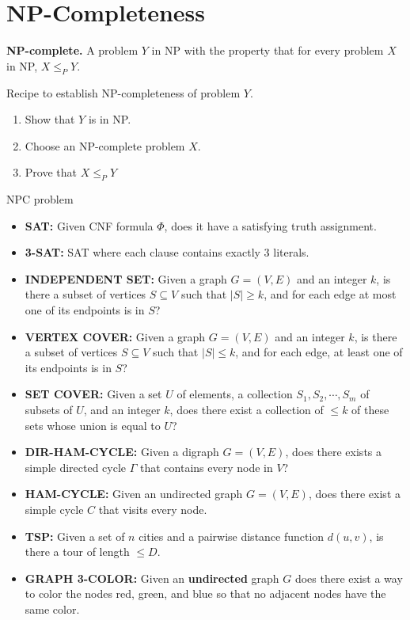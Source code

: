 \documentclass{article}
\begin{document}
\section*{NP-Completeness}
\textbf{NP-complete. } 
A problem $Y$ in NP with the property that for every
problem $X$ in NP, $X \leq_P Y$.

Recipe to establish NP-completeness of problem $Y$.
\begin{enumerate}
    \item Show that $Y$ is in NP.
    \item Choose an NP-complete problem $X$.
    \item Prove that $X \leq_P Y$
\end{enumerate}

NPC problem
\begin{itemize}
    \item \textbf{SAT: } Given CNF formula $\Phi$, does it have a satisfying truth assignment.
    \item \textbf{3-SAT: } SAT where each clause contains exactly $3$ literals.
    \item \textbf{INDEPENDENT SET:} Given a graph $G = (V, E)$ and an integer $k$, 
    is there a subset of vertices $S \subseteq V$ such that $|S| \geq k$, 
    and for each edge at most one of its endpoints is in $S$?
    \item \textbf{VERTEX COVER:} Given a graph $G = (V, E)$ and an integer $k$,
    is there a subset of vertices $S \subseteq V$ such that $|S| \leq k$, 
    and for each edge, at least one of its endpoints is in $S$?
    \item \textbf{SET COVER: } Given a set $U$ of elements, 
    a collection $S_1 , S_2 , \cdots , S_m$ of subsets of $U$, 
    and an integer $k$, does there exist a collection of $\leq k$ of
    these sets whose union is equal to $U$?
    \item \textbf{DIR-HAM-CYCLE: } Given a digraph $G = (V, E)$, 
    does there exists a simple directed cycle $\Gamma$ that contains every node in $V$?
    \item \textbf{HAM-CYCLE: } Given an undirected graph $G = (V, E)$, 
    does there exist a simple cycle $C$ that visits every node.
    \item \textbf{TSP: } Given a set of $n$ cities and a pairwise distance function $d(u, v)$, 
    is there a tour of length $\leq D$.
    \item \textbf{GRAPH 3-COLOR: } Given an \textbf{undirected} graph $G$ does there exist a way to color the nodes red, green, and blue so that no adjacent nodes have the same color.

\end{itemize}
\end{document}
